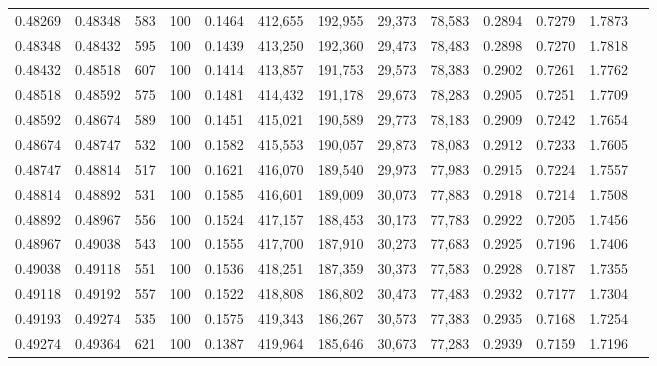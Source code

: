 \begin{tabular}{rrrrrrrrrrrrr}
0.48269 & 0.48348 &   583 & 100 &                                     0.1464 & 412,655 & 192,955 &  29,373 &  78,583 & 0.2894 & 0.7279 & 1.7873 \\
0.48348 & 0.48432 &   595 & 100 &                                     0.1439 & 413,250 & 192,360 &  29,473 &  78,483 & 0.2898 & 0.7270 & 1.7818 \\
0.48432 & 0.48518 &   607 & 100 &                                     0.1414 & 413,857 & 191,753 &  29,573 &  78,383 & 0.2902 & 0.7261 & 1.7762 \\
0.48518 & 0.48592 &   575 & 100 &                                     0.1481 & 414,432 & 191,178 &  29,673 &  78,283 & 0.2905 & 0.7251 & 1.7709 \\
0.48592 & 0.48674 &   589 & 100 &                                     0.1451 & 415,021 & 190,589 &  29,773 &  78,183 & 0.2909 & 0.7242 & 1.7654 \\
0.48674 & 0.48747 &   532 & 100 &                                     0.1582 & 415,553 & 190,057 &  29,873 &  78,083 & 0.2912 & 0.7233 & 1.7605 \\
0.48747 & 0.48814 &   517 & 100 &                                     0.1621 & 416,070 & 189,540 &  29,973 &  77,983 & 0.2915 & 0.7224 & 1.7557 \\
0.48814 & 0.48892 &   531 & 100 &                                     0.1585 & 416,601 & 189,009 &  30,073 &  77,883 & 0.2918 & 0.7214 & 1.7508 \\
0.48892 & 0.48967 &   556 & 100 &                                     0.1524 & 417,157 & 188,453 &  30,173 &  77,783 & 0.2922 & 0.7205 & 1.7456 \\
0.48967 & 0.49038 &   543 & 100 &                                     0.1555 & 417,700 & 187,910 &  30,273 &  77,683 & 0.2925 & 0.7196 & 1.7406 \\
0.49038 & 0.49118 &   551 & 100 &                                     0.1536 & 418,251 & 187,359 &  30,373 &  77,583 & 0.2928 & 0.7187 & 1.7355 \\
0.49118 & 0.49192 &   557 & 100 &                                     0.1522 & 418,808 & 186,802 &  30,473 &  77,483 & 0.2932 & 0.7177 & 1.7304 \\
0.49193 & 0.49274 &   535 & 100 &                                     0.1575 & 419,343 & 186,267 &  30,573 &  77,383 & 0.2935 & 0.7168 & 1.7254 \\
0.49274 & 0.49364 &   621 & 100 &                                     0.1387 & 419,964 & 185,646 &  30,673 &  77,283 & 0.2939 & 0.7159 & 1.7196 \\

\end{tabular}
